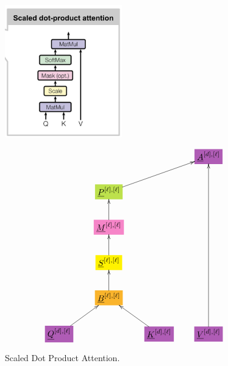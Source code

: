\documentclass[12pt]{article}
\begin{document}
\begin{figure}[h!]\centering
\begin{minipage}{.5\linewidth}
\includegraphics[width=2in]{scaled-dot-prod-att.jpg}
\end{minipage}%
\begin{minipage}{.5\linewidth}
$$\xymatrix{
&&&*+[F*:Orchid]{\underline{A}^{[d], [\ell]}}
\\
&*+[F*:SpringGreen]{\underline{P}^{[\ell], [\ell]}}\ar[urr]&&
\\
&*+[F*:Lavender]{\underline{M}^{[\ell], [\ell]}}\ar[u]&&
\\
&*+[F*:yellow]{\underline{S}^{[\ell],[\ell]}}\ar[u]&&
\\
&*+[F*:Dandelion]{\underline{B}^{[\ell], [\ell]}}\ar[u]&&
\\
*+[F*:Orchid]{\underline{Q}^{[d],[\ell]}}\ar[ur]&&*+[F*:Orchid]{\underline{K}^{[d],[\ell]}}\ar[ul]&*+[F*:Orchid]{\underline{V}^{[d],[\ell]}}\ar[uuuuu]
}$$
\end{minipage}
\caption{Scaled Dot Product Attention.}
\label{fig-texnn-for-scaled-dot-prod-att}
\end{figure}
\end{document}
